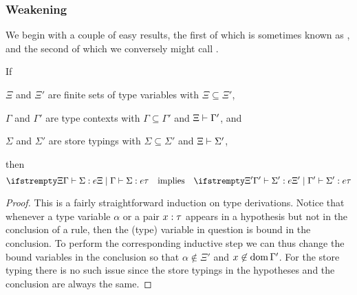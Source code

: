 \subsubsection{Weakening}

We begin with a couple of easy results, the first of which is sometimes known as , and the second of which we conversely might call .




\begin{lemma}[Weakening]
    \label{lem:weakening}
    If
    \begin{enumlemma}
        \item $\Xi$ and $\Xi'$ are finite sets of type variables with $\Xi \subseteq \Xi'$,
        \item $\Gamma$ and $\Gamma'$ are type contexts with $\Gamma \subseteq \Gamma'$ and $\Xi \vdash \Gamma'$, and
        \item $\Sigma$ and $\Sigma'$ are store typings with $\Sigma \subseteq \Sigma'$ and $\Xi \vdash \Sigma'$,
    \end{enumlemma}
    then
    \begin{equation*}
        \typerel{\Xi}{\Gamma}{\Sigma}{e}{\tau}
        \quad \text{implies} \quad
        \typerel{\Xi'}{\Gamma'}{\Sigma'}{e}{\tau}
    \end{equation*}
\end{lemma}

\begin{proof}
    This is a fairly straightforward induction on type derivations. Notice that whenever a type variable $\alpha$ or a pair $\hastype{x}{\tau}$ appears in a hypothesis but not in the conclusion of a rule, then the (type) variable in question is bound in the conclusion. To perform the corresponding inductive step we can thus change the bound variables in the conclusion so that $\alpha \not\in \Xi'$ and $x \not\in \operatorname{dom}{\Gamma'}$. For the store typing there is no such issue since the store typings in the hypotheses and the conclusion are always the same.
\end{proof}


